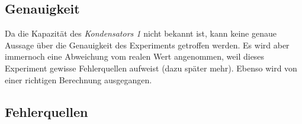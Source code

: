\documentclass[a4paper,12pt]{article}
\begin{document}
\subsection{Genauigkeit}

Da die Kapazität des \textit{Kondensators 1} nicht bekannt ist, kann keine genaue Aussage über die Genauigkeit des Experiments getroffen werden. Es wird aber immernoch eine Abweichung vom realen Wert angenommen, weil dieses Experiment gewisse Fehlerquellen aufweist (dazu später mehr). Ebenso wird von einer richtigen Berechnung ausgegangen.\\










\subsection{Fehlerquellen}
\end{document}
